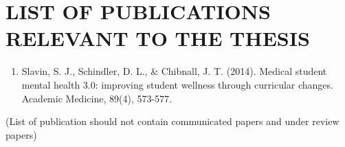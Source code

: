 \chapter*{\centering \large\textbf{LIST OF PUBLICATIONS RELEVANT TO THE THESIS}}
\noindent
\begin{enumerate}
	
\item Slavin, S. J., Schindler, D. L., \& Chibnall, J. T. (2014). Medical student mental health 3.0: improving student wellness through curricular changes. Academic Medicine, 89(4), 573-577.


\end{enumerate}
(List of publication should not contain communicated papers and under review
papers)
